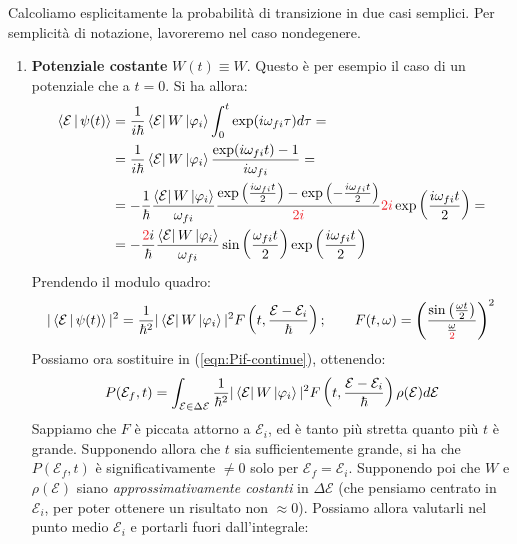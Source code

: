 \documentclass[../../InformazioneQuantistica.tex]{subfiles}
\begin{document}
Calcoliamo esplicitamente la probabilità di transizione in due casi semplici. Per semplicità di notazione, lavoreremo nel caso nondegenere.
\begin{enumerate}
    \item \textbf{Potenziale costante} $W(t) \equiv W$. Questo è per esempio il caso di un potenziale che  a $t=0$. Si ha allora:
    \begin{align*}
        \braket{\mathcal{E}|\psi(t)} &= \frac{1}{i\hbar} \bra{\mathcal{E}}W\ket{\varphi_i} \int_0^t \exp(i\omega_{fi}\tau)d\tau =\\
        &= \frac{1}{i\hbar} \bra{\mathcal{E}}W\ket{\varphi_i} \frac{\exp(i\omega_{fi}t)-1}{i\omega_{fi}} =\\
        &= -\frac{1}{\hbar} \frac{\bra{\mathcal{E}}W\ket{\varphi_i}}{\omega_{fi}} \frac{\exp\left( \frac{i\omega_{fi}t}{2}\right) - \exp\left(-\frac{i\omega_{fi}t}{2}\right)}{\textcolor{Red}{2i}} \textcolor{Red}{2i} \exp\left( \frac{i\omega_{fi}t}{2}\right) =\\
        &= -\frac{\textcolor{Red}{2}i}{\hbar} \frac{\bra{\mathcal{E}}W\ket{\varphi_i}}{\omega_{fi}} \sin\left(\frac{\omega_{fi}t}{2}\right) \exp\left( \frac{i\omega_{fi}t}{2}\right)
    \end{align*}
    Prendendo il modulo quadro:
    \begin{align*}
       |\braket{\mathcal{E}|\psi(t)}|^2 = \frac{1}{\hbar^2} |\bra{\mathcal{E}}W\ket{\varphi_i}|^2 F\left(t, \frac{\mathcal{E}-\mathcal{E}_i}{\hbar}\right); \qquad F(t,\omega) = \left(\frac{\sin\left(\frac{\omega t}{2}\right)}{\frac{\omega}{\textcolor{Red}{2}}}\right)^2 
    \end{align*}
    Possiamo ora sostituire in (\ref{eqn:Pif-continue}), ottenendo:
    \begin{align*}
        P(\mathcal{E}_f,t) = \int_{\mathcal{E} \in \Delta \mathcal{E}} 
        \frac{1}{\hbar^2} |\Bra{\mathcal{E}}W\Ket{\varphi_i}|^2 F\left( t, \frac{\mathcal{E}-\mathcal{E}_i}{\hbar}\right) \rho(\mathcal{E}) d\mathcal{E}
    \end{align*}
    Sappiamo che $F$ è piccata attorno a $\mathcal{E}_i$, ed è tanto più stretta quanto più $t$ è grande. Supponendo allora che $t$ sia sufficientemente grande, si ha che $P(\mathcal{E}_f,t)$ è significativamente $\neq 0$ solo per $\mathcal{E}_f = \mathcal{E}_i$. Supponendo poi che $W$ e $\rho(\mathcal{E})$ siano \textit{approssimativamente costanti} in $\Delta\mathcal{E}$ (che pensiamo centrato in $\mathcal{E}_i$, per poter ottenere un risultato non $\approx 0$). Possiamo allora valutarli nel punto medio $\mathcal{E}_i$ e portarli fuori dall'integrale:

\end{enumerate}
\end{document}
